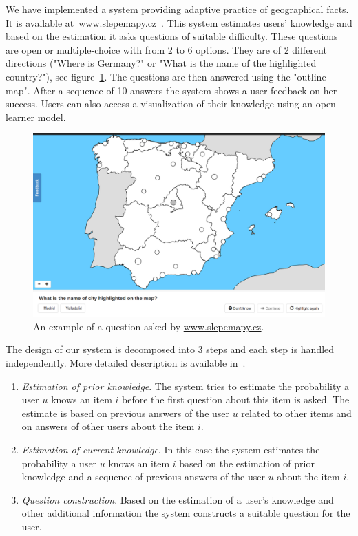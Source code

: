 \documentclass[table,color,cover,twoside,nolot,nolof]{fithesis3/fithesis3}
\begin{document}
We have implemented a system providing adaptive practice of geographical
facts. It is available at~\url{www.slepemapy.cz}~\cite{papousek2014adaptive}. This system
estimates users' knowledge and based on the estimation it asks questions of
suitable difficulty. These questions are open or multiple-choice with from 2 to
6 options. They are of 2 different directions ("Where is Germany?" or "What is
the name of the highlighted country?"), see
figure~\ref{figure:example_question}. The questions are then answered using the
"outline map". After a sequence of 10 answers the system shows a user feedback
on her success. Users can also access a visualization of their knowledge using
an open learner model.

\begin{figure}[h]
	\begin{center}
		\includegraphics[width=\textwidth]{figure/slepemapy_spain_highlighted}
		\caption{An example of a question asked by \url{www.slepemapy.cz}.}
		\label{figure:example_question}
	\end{center}
\end{figure}

The design of our system is decomposed into 3 steps and each step is handled
independently. More detailed description is available
in~\cite{papousek2014adaptive, papousek2015impact}.

\begin{enumerate}
	\item \emph{Estimation of prior knowledge}. The system tries to estimate the
		probability a user $u$ knows an item $i$ before the first question
		about this item is asked. The estimate is based on previous answers of the
		user $u$ related to other items and on answers of other users about the
		item $i$.
	\item \emph{Estimation of current knowledge}. In this case the system
		estimates the probability a user $u$ knows an item $i$ based on the
		estimation of prior knowledge and a sequence of previous answers of the
		user $u$ about the item $i$.
	\item \emph{Question construction}. Based on the estimation of a user's
		knowledge and other additional information the system constructs a suitable
		question for the user.
\end{enumerate}
\end{document}
